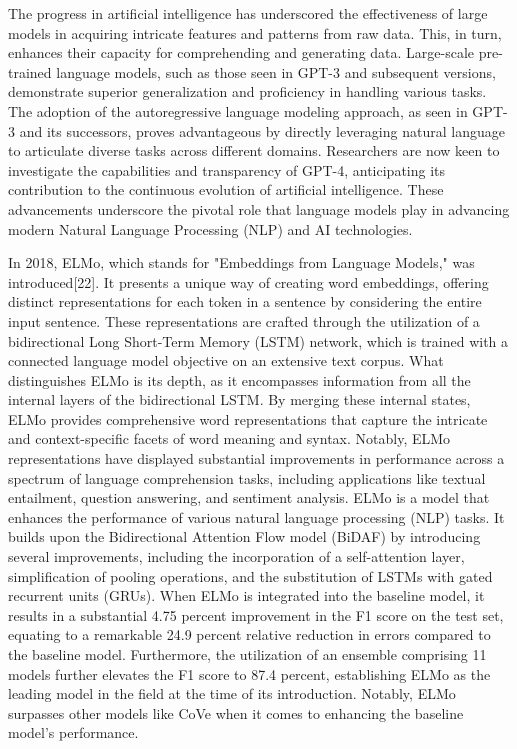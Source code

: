 \documentclass[conference]{IEEEtran}
\begin{document}
The progress in artificial intelligence has underscored the effectiveness of large models in acquiring intricate features and patterns from raw data. This, in turn, enhances their capacity for comprehending and generating data. Large-scale pre-trained language models, such as those seen in GPT-3 and subsequent versions, demonstrate superior generalization and proficiency in handling various tasks. The adoption of the autoregressive language modeling approach, as seen in GPT-3 and its successors, proves advantageous by directly leveraging natural language to articulate diverse tasks across different domains. Researchers are now keen to investigate the capabilities and transparency of GPT-4, anticipating its contribution to the continuous evolution of artificial intelligence. These advancements underscore the pivotal role that language models play in advancing modern Natural Language Processing (NLP) and AI technologies.



In 2018, ELMo, which stands for "Embeddings from Language Models," was introduced[22]. It presents a unique way of creating word embeddings, offering distinct representations for each token in a sentence by considering the entire input sentence. These representations are crafted through the utilization of a bidirectional Long Short-Term Memory (LSTM) network, which is trained with a connected language model objective on an extensive text corpus. What distinguishes ELMo is its depth, as it encompasses information from all the internal layers of the bidirectional LSTM. By merging these internal states, ELMo provides comprehensive word representations that capture the intricate and context-specific facets of word meaning and syntax. Notably, ELMo representations have displayed substantial improvements in performance across a spectrum of language comprehension tasks, including applications like textual entailment, question answering, and sentiment analysis.
ELMo is a model that enhances the performance of various natural language processing (NLP) tasks. It builds upon the Bidirectional Attention Flow model (BiDAF) by introducing several improvements, including the incorporation of a self-attention layer, simplification of pooling operations, and the substitution of LSTMs with gated recurrent units (GRUs). When ELMo is integrated into the baseline model, it results in a substantial 4.75 percent improvement in the F1 score on the test set, equating to a remarkable 24.9 percent relative reduction in errors compared to the baseline model. Furthermore, the utilization of an ensemble comprising 11 models further elevates the F1 score to 87.4 percent, establishing ELMo as the leading model in the field at the time of its introduction. Notably, ELMo surpasses other models like CoVe when it comes to enhancing the baseline model's performance.
\end{document}
